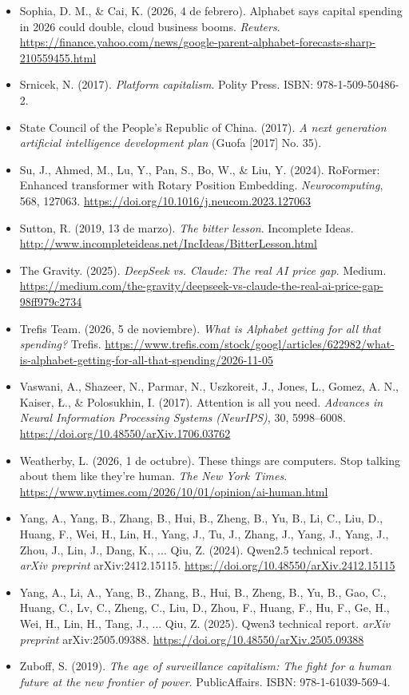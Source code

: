 \begin{itemize}[leftmargin=1.5em, label={}, itemsep=0.22ex, parsep=0pt]
    \item Sophia, D. M., \& Cai, K. (2026, 4 de febrero). Alphabet says capital spending in 2026 could double, cloud business booms. \textit{Reuters}. \url{https://finance.yahoo.com/news/google-parent-alphabet-forecasts-sharp-210559455.html}
    \item Srnicek, N. (2017). \textit{Platform capitalism}. Polity Press. ISBN: 978-1-509-50486-2.
    \item State Council of the People's Republic of China. (2017). \textit{A next generation artificial intelligence development plan} (Guofa [2017] No. 35).
    \item Su, J., Ahmed, M., Lu, Y., Pan, S., Bo, W., \& Liu, Y. (2024). RoFormer: Enhanced transformer with Rotary Position Embedding. \textit{Neurocomputing}, 568, 127063. \url{https://doi.org/10.1016/j.neucom.2023.127063}
    \item Sutton, R. (2019, 13 de marzo). \textit{The bitter lesson}. Incomplete Ideas. \url{http://www.incompleteideas.net/IncIdeas/BitterLesson.html}
    \item The Gravity. (2025). \textit{DeepSeek vs. Claude: The real AI price gap}. Medium. \url{https://medium.com/the-gravity/deepseek-vs-claude-the-real-ai-price-gap-98ff979c2734}
    \item Trefis Team. (2026, 5 de noviembre). \textit{What is Alphabet getting for all that spending?} Trefis. \url{https://www.trefis.com/stock/googl/articles/622982/what-is-alphabet-getting-for-all-that-spending/2026-11-05}
    \item Vaswani, A., Shazeer, N., Parmar, N., Uszkoreit, J., Jones, L., Gomez, A. N., Kaiser, \L{}., \& Polosukhin, I. (2017). Attention is all you need. \textit{Advances in Neural Information Processing Systems (NeurIPS)}, 30, 5998--6008. \url{https://doi.org/10.48550/arXiv.1706.03762}
    \item Weatherby, L. (2026, 1 de octubre). These things are computers. Stop talking about them like they're human. \textit{The New York Times}. \url{https://www.nytimes.com/2026/10/01/opinion/ai-human.html}
    \item Yang, A., Yang, B., Zhang, B., Hui, B., Zheng, B., Yu, B., Li, C., Liu, D., Huang, F., Wei, H., Lin, H., Yang, J., Tu, J., Zhang, J., Yang, J., Yang, J., Zhou, J., Lin, J., Dang, K., ... Qiu, Z. (2024). Qwen2.5 technical report. \textit{arXiv preprint} arXiv:2412.15115. \url{https://doi.org/10.48550/arXiv.2412.15115}
    \item Yang, A., Li, A., Yang, B., Zhang, B., Hui, B., Zheng, B., Yu, B., Gao, C., Huang, C., Lv, C., Zheng, C., Liu, D., Zhou, F., Huang, F., Hu, F., Ge, H., Wei, H., Lin, H., Tang, J., ... Qiu, Z. (2025). Qwen3 technical report. \textit{arXiv preprint} arXiv:2505.09388. \url{https://doi.org/10.48550/arXiv.2505.09388}
    \item Zuboff, S. (2019). \textit{The age of surveillance capitalism: The fight for a human future at the new frontier of power}. PublicAffairs. ISBN: 978-1-61039-569-4.
\end{itemize}
